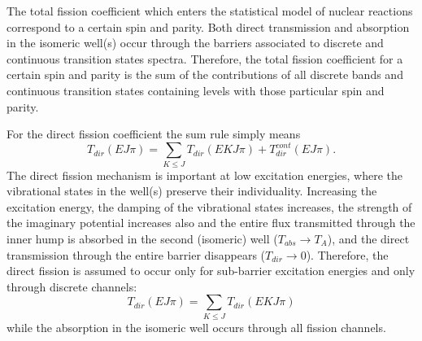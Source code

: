 \documentclass[twocolumn,amsmath,amssymb,10pt,groupedaddress,letter]{revtex4}
\begin{document}
The total fission coefficient which enters the statistical model of nuclear reactions
correspond to a certain spin and parity. Both direct transmission and absorption in the
isomeric well(s) occur through the barriers associated to discrete and continuous transition
states spectra. Therefore, the total fission coefficient for a certain
spin and parity is the sum of the contributions of all discrete bands and continuous transition
states containing levels with those particular spin and parity.

For the direct fission coefficient the sum rule simply means
%
\begin{equation}
T_{dir}(EJ\pi)= \sum_{K\le J}T_{dir}(EKJ\pi)+ T_{dir}^{cont}(EJ\pi).
\end{equation}
The direct fission mechanism is important at low excitation energies, where the vibrational
states in the well(s) preserve their individuality. Increasing the excitation energy,
the damping of the vibrational states increases,
the strength of the imaginary potential
increases also and the entire flux transmitted through the inner hump is absorbed
in the second (isomeric) well ($T_{abs}\rightarrow T_{A}$), and the direct
transmission through the entire barrier disappears ($T_{dir}\rightarrow0$).
Therefore, the direct fission is assumed to occur only for sub-barrier excitation energies
and only through discrete channels:
\begin{equation}
T_{dir}(EJ\pi)=\sum_{K\le J}T_{dir}(EKJ\pi) \label{tdirt}%
\end{equation}
while the absorption in the isomeric well occurs through all fission channels.
\end{document}

